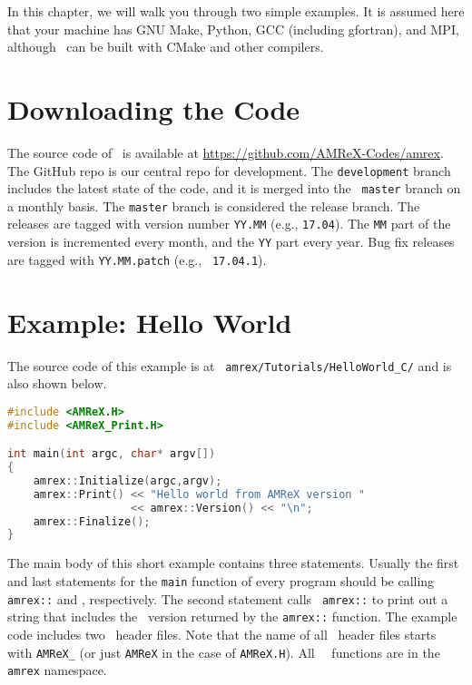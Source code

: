 In this chapter, we will walk you through two simple examples.  It is
assumed here that your machine has GNU Make, Python, GCC (including
gfortran), and MPI, although \amrex\ can be built with CMake and other
compilers. 

\section{Downloading the Code}

The source code of \amrex\ is available at
\url{https://github.com/AMReX-Codes/amrex}.  The GitHub repo is our
central repo for development.  The {\tt development} branch
includes the latest state of the code, and it is merged into the {\tt
  master} branch on a monthly basis.  The {\tt master} branch is
considered the release branch.  The releases are tagged with version
number {\tt YY.MM} (e.g., {\tt 17.04}).  The {\tt MM} part of the
version is incremented every month, and the {\tt YY} part every year.
Bug fix releases are tagged with {\tt YY.MM.patch} (e.g., {\tt
  17.04.1}).

\section{Example: Hello World}

The source code of this example is at {\tt
  amrex/Tutorials/HelloWorld\_C/} and is also shown below. 

\begin{lstlisting}[language=cpp]
#include <AMReX.H>
#include <AMReX_Print.H>

int main(int argc, char* argv[])
{
    amrex::Initialize(argc,argv);
    amrex::Print() << "Hello world from AMReX version " 
                   << amrex::Version() << "\n";
    amrex::Finalize();
}
\end{lstlisting}

The main body of this short example contains three statements.
Usually the first and last statements for the {\tt main} function of
every program should be calling {\tt amrex::} and
, respectively.  The second statement calls {\tt
  amrex::} to print out a string that includes the
\amrex\ version returned by the {\tt amrex::}
function.  The example code includes two \amrex\ header files.  Note
that the name of all \amrex\ header files starts with {\tt AMReX\_}
(or just {\tt AMReX} in the case of {\tt AMReX.H}).  All \amrex\
\cpp\ functions are in the {\tt amrex} namespace.  

